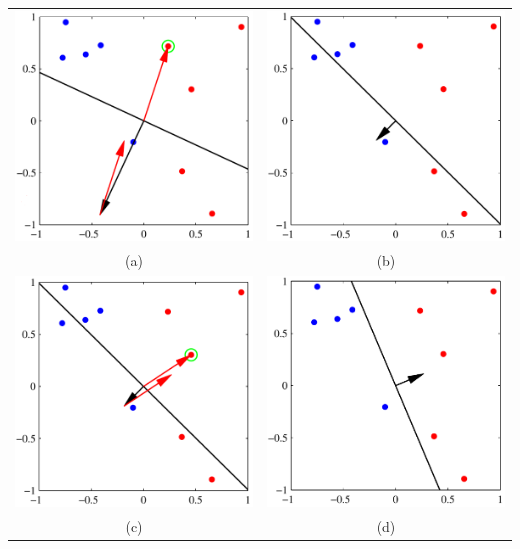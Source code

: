 \documentclass[main.tex]{subfiles}
\begin{document}
\begin{center}
\begin{tabular}{cc}
  \includegraphics[width=65mm]{img/Perceptron_Alg1.PNG} &   \includegraphics[width=65mm]{img/Perceptron_Alg2.PNG} \\
(a) & (b) \\[6pt]
 \includegraphics[width=65mm]{img/Perceptron_Alg3.PNG} &   \includegraphics[width=65mm]{img/Perceptron_Alg4.PNG} \\
(c) & (d) \\[6pt]
\end{tabular}
\end{center}
\end{document}
